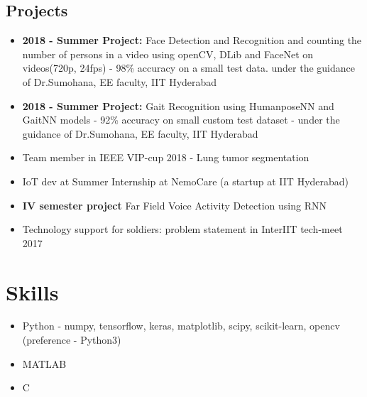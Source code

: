 \documentclass[11pt]{article} %
\begin{document}
\subsection{Projects}
\begin{itemize}
    \item \textbf{2018 - Summer Project:} Face Detection and Recognition and counting the number of persons in a video using openCV, DLib and FaceNet on videos(720p, 24fps) - 98\% accuracy on a small test data.  under the guidance of Dr.Sumohana, EE faculty, IIT Hyderabad 
    \item \textbf{2018 - Summer Project:} Gait Recognition using HumanposeNN and GaitNN models - 92\% accuracy on small custom test dataset - under the guidance of Dr.Sumohana, EE faculty, IIT Hyderabad
    \item Team member in IEEE VIP-cup 2018 - Lung tumor segmentation
    \item IoT dev at Summer Internship at NemoCare  (a startup at IIT Hyderabad)
    \item \textbf{IV semester project} Far Field Voice Activity Detection using RNN 
    \item Technology support for soldiers: problem statement in InterIIT tech-meet 2017
\end{itemize}

\hline

\section{Skills}

{
\begin{itemize}
    \item Python - numpy, tensorflow, keras, matplotlib, scipy, scikit-learn, opencv \\ (preference - Python3)
    \item MATLAB
    \item C
\end{itemize}
}


\end{document}
